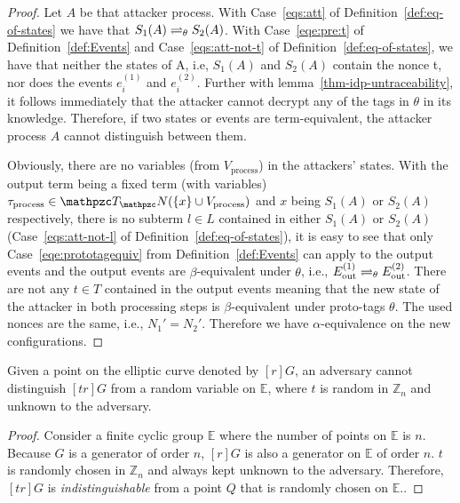 \begin{proof}
    Let $A$ be that attacker process. 
    With Case~\ref{eqs:att} of Definition~\ref{def:eq-of-states} we have that $S_1(A) \rightleftharpoons_{\theta} S_2(A)$.
    With Case~\ref{eqe:pre:t} of Definition~\ref{def:Events} and Case~\ref{eqs:att-not-t} of Definition~\ref{def:eq-of-states}, 
    we have that neither the states of A, i.e, $S_1(A)$ and $S_2(A)$ contain the nonce t, nor does the events $e_i^{(1)}$ and $e_i^{(2)}$.
    Further with lemma~\ref{thm-idp-untraceability}, it follows immediately that the attacker cannot decrypt any of the tags in $\theta$ in its knowledge.
    Therefore, if two states or events are term-equivalent, the attacker process $A$ cannot distinguish between them.

    Obviously, there are no variables (from $V_\text{process}$) in the attackers' states.
    With the output term being a fixed term (with variables)
    $\tau_{\text{process}} \in \terms(\{x\} \cup V_\text{process})$ 
    and $x$ being $S_1(A)$ or $S_2(A)$ respectively, 
    there is no subterm $l \in L$ contained in either $S_1(A)$ or $S_2(A)$ 
    (Case~\ref{eqs:att-not-l} of Definition~\ref{def:eq-of-states}), 
    it is easy to see that only Case~\ref{eqe:prototagequiv} from Definition~\ref{def:Events} can apply to the output events 
    and the output events are $\beta$-equivalent under $\theta$, 
    i.e., $E ^{(1)}_\text{out} \rightleftharpoons_{\theta} E^{(2)}_\text{out}$. 
    There are not any $t \in T$ contained in the output events meaning that 
    the new state of the attacker in both processing steps is $\beta$-equivalent under proto-tags $\theta$.
    The used nonces are the same, i.e., $N_1' = N_2'$. 
    Therefore we have $\alpha$-equivalence on the new configurations.
  \end{proof}

  \begin{lemma}\label{thm-idp-untraceability}
    Given a point on the elliptic curve denoted by $[r]G$, 
    an adversary cannot distinguish $[tr]G$ from a random variable on $\mathbb{E}$, 
    where $t$ is random in $\mathbb{Z}_n$ and unknown to the adversary.
  \end{lemma}
  \begin{proof}
    Consider a finite cyclic group $\mathbb{E}$ where the number of points on $\mathbb{E}$ is $n$. 
    Because $G$ is a generator of order $n$, $[r]G$ is also a generator on $\mathbb{E}$ of order $n$. 
    $t$ is randomly chosen in $\mathbb{Z}_n$ and always kept unknown to the adversary. 
    Therefore, $[tr]G$ is \emph{indistinguishable} from a point $Q$ that is randomly chosen on $\mathbb{E}$.\cite{oprf-proved,voprf-proved}.
  \end{proof}
  
